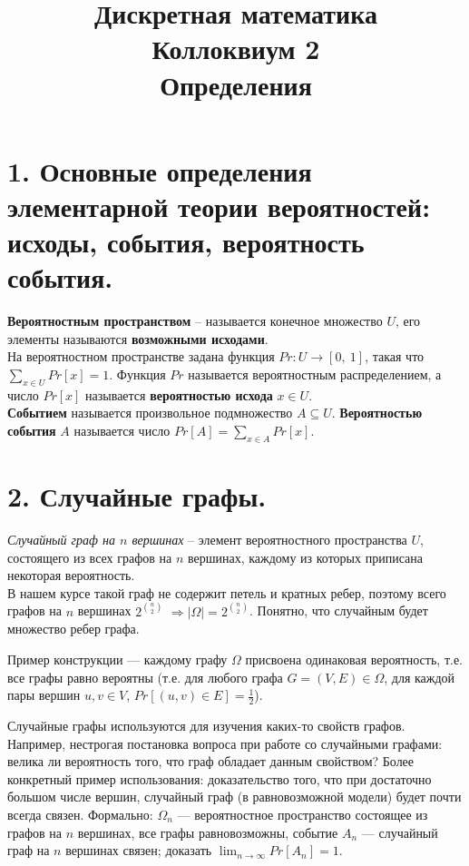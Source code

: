 

\title{Дискретная математика\\Коллоквиум 2 \\ Определения}

\maketitle

\section*{1. Основные определения элементарной теории вероятностей: исходы, события, вероятность события.}

\textbf{Вероятностным пространством} -- называется конечное множество $U$, его элементы называются \textbf{возможными исходами}. \\
На вероятностном пространстве задана функция $Pr: U \to [0,\ 1]$, такая что $\sum\limits_{x \in U} Pr[x] = 1$. Функция $Pr$ называется вероятностным распределением, а число $Pr[x]$ называется \textbf{вероятностью исхода} $x \in U$. \\
\textbf{Событием} называется произвольное подмножество $A \subseteq U$. \textbf{Вероятностью события} $A$ называется число $Pr[A] = \sum\limits_{x \in A} Pr[x]$.

\section*{2. Случайные графы.}
\textit{Случайный граф на $n$ вершинах} -- элемент вероятностного пространства $U$, состоящего из всех графов на $n$ вершинах, каждому из которых приписана некоторая вероятность. \\
В нашем курсе такой граф не содержит петель и кратных ребер, поэтому всего графов на $n$ вершинах $2^{n \choose 2}$ $\Rightarrow |\Omega| = 2^{n \choose 2}$. Понятно, что случайным будет множество ребер графа. 

  
Пример конструкции --- каждому графу $\Omega$ присвоена одинаковая вероятность, т.е. все графы равно вероятны (т.е. для любого графа $G = (V, E) \in \Omega$, для каждой пары вершин $u, v \in V$, $Pr[(u, v) \in E] = \frac{1}{2}$).
  
Случайные графы используются для изучения каких-то свойств графов. Например, нестрогая постановка вопроса при работе со случайными графами: велика ли вероятность того, что граф обладает данным свойством? Более конкретный пример использования: доказательство того, что при достаточно большом числе вершин, случайный граф (в равновозможной модели) будет почти всегда связен. Формально: $\Omega_n$ --- вероятностное пространство состоящее из графов на $n$ вершинах, все графы равновозможны, событие $A_n$ --- случайный граф на $n$ вершинах связен; доказать $ \lim_{n\to\infty} Pr[A_n] = 1 $.



